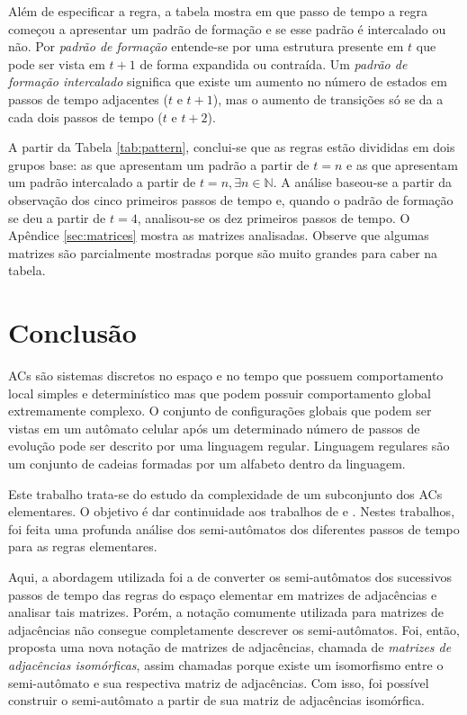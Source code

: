 \documentclass[12pt,a4paper]{article}
\begin{document}
Além de especificar a regra, a tabela mostra em que passo de tempo a regra
começou a apresentar um padrão de formação e se esse padrão é intercalado
ou não. Por \textit{padrão de formação} entende-se por uma estrutura presente em $t$ que
pode ser vista em $t+1$ de forma expandida ou contraída. Um \textit{padrão de
formação intercalado} significa que existe um aumento no número de estados
em passos de tempo adjacentes ($t$ e $t+1$), mas o aumento de transições só se
da a cada dois passos de tempo ($t$ e $t+2$).

A partir da Tabela \ref{tab:pattern}, conclui-se que as regras estão divididas
em dois grupos base: as que apresentam um padrão a partir de $t=n$ e as que
apresentam um padrão intercalado a partir de $t=n,\exists n \in \mathbb{N}$.
A análise baseou-se a partir da observação dos cinco primeiros passos de
tempo e, quando o padrão de formação se deu a partir de $t=4$, analisou-se
os dez primeiros passos de tempo. O Apêndice \ref{sec:matrices} mostra as
matrizes analisadas. Observe que algumas matrizes são parcialmente mostradas
porque são muito grandes para caber na tabela.

\newpage

\section{Conclusão}\label{sec:conclude}

ACs são sistemas discretos no espaço e no tempo que
possuem comportamento local simples e determinístico mas que podem possuir
comportamento global extremamente complexo. O conjunto de configurações
globais que podem ser vistas em um autômato celular após um determinado
número de passos de evolução pode ser descrito por uma linguagem
regular. Linguagem regulares são um conjunto de cadeias formadas
por um alfabeto dentro da linguagem.

Este trabalho trata-se do estudo da complexidade de um subconjunto dos ACs
elementares. O objetivo é dar continuidade aos trabalhos de
 e . Nestes trabalhos, foi feita
uma profunda análise dos semi-autômatos dos diferentes passos de tempo
para as regras elementares.

Aqui, a abordagem utilizada foi a de converter os semi-autômatos dos sucessivos
passos de tempo das regras do espaço elementar em matrizes de adjacências e analisar
tais matrizes. Porém, a notação comumente utilizada para matrizes de adjacências
não consegue completamente descrever os semi-autômatos. Foi, então, proposta uma
nova notação de matrizes de adjacências, chamada de \textit{matrizes de
adjacências isomórficas}, assim chamadas porque existe um isomorfismo entre
o semi-autômato e sua respectiva matriz de adjacências. Com isso, foi possível
construir o semi-autômato a partir de sua matriz de adjacências isomórfica.
\end{document}
